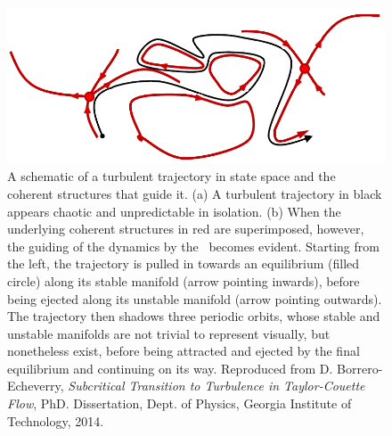 \begin{figure}[h]
\centerline{
\includegraphics[width=\textwidth]{Figs/phaseSpaceTraj.pdf}}
\caption{A schematic of a turbulent trajectory in state space and the coherent structures that guide it. (a) A turbulent trajectory in black appears chaotic and unpredictable in isolation. (b) When the underlying coherent structures in red are superimposed, however, the guiding of the dynamics by the \ecs\ becomes evident. Starting from the left, the trajectory is pulled in towards an equilibrium (filled circle) along its stable manifold (arrow pointing inwards), before being ejected along its unstable manifold (arrow pointing outwards). The trajectory then shadows three periodic orbits, whose stable and unstable manifolds are not trivial to represent visually, but nonetheless exist, before being attracted and ejected by the final equilibrium and continuing on its way. Reproduced from D. Borrero-Echeverry, \emph{Subcritical Transition to Turbulence in Taylor-Couette Flow}, PhD. Dissertation, Dept. of Physics, Georgia Institute of Technology, 2014.}\label{fig:guidedTurbulence}
\end{figure}

